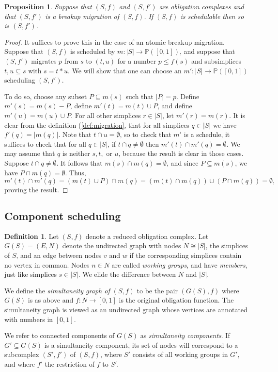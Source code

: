 \documentclass{amsart}
\def\PP{{\mathbb P}}
\def\to{\rightarrow}
\def\taking{\colon}
\def\ss{\subseteq}
\def\iso{\cong}
\newtheorem{proposition}[theorem]{Proposition}
\theoremstyle{remark}
\theoremstyle{definition}
\newtheorem{definition}[theorem]{Definition}
\begin{document}
\begin{proposition}

Suppose that $(S,f)$ and $(S,f')$ are obligation complexes and that $(S,f')$ is a breakup migration of $(S,f)$. If $(S,f)$ is schedulable then so is $(S,f')$.

\end{proposition}

\begin{proof}

It suffices to prove this in the case of an atomic breakup migration. Suppose that $(S,f)$ is scheduled by $m\taking |S|\to\PP([0,1])$, and suppose that $(S,f')$ migrates $p$ from $s$ to $(t,u)$ for a number $p\leq f(s)$ and subsimplices $t,u\ss s$ with $s=t\ast u$. We will show that one can choose an $m'\taking |S|\to\PP([0,1])$ scheduling $(S,f')$.

To do so, choose any subset $P\ss m(s)$ such that $|P|=p$. Define $m'(s)=m(s)-P$, define $m'(t)=m(t)\cup P$, and define $m'(u)=m(u)\cup P$. For all other simplices $r\in|S|$, let $m'(r)=m(r)$. It is clear from the definition (\ref{def:migration}, that for all simplices $q\in |S|$ we have $f'(q)=|m(q)|$. Note that $t\cap u=\emptyset$, so to check that $m'$ is a schedule, it suffices to check that for all $q\in|S|$, if $t\cap q\neq\emptyset$ then $m'(t)\cap m'(q)=\emptyset$. We may assume that $q$ is neither $s,t,$ or $u$, because the result is clear in those cases. Suppose $t\cap q\neq\emptyset$. It follows that $m(s)\cap m(q)=\emptyset$, and since $P\ss m(s)$, we have  $P\cap m(q)=\emptyset$. Thus, $$m'(t)\cap m'(q)=(m(t)\cup P)\cap m(q)=(m(t)\cap m(q))\cup(P\cap m(q))=\emptyset,$$ proving the result. 

\end{proof}

\subsection{Component scheduling}\label{sec:components}

\begin{definition}

Let $(S,f)$ denote a reduced obligation complex. Let $G(S)=(E,N)$ denote the undirected graph with nodes $N\iso |S|$, the simplices of $S$, and an edge between nodes $v$ and $w$ if the corresponding simplices contain no vertex in common. Nodes $n\in N$ are called {\em working groups}, and have {\em members}, just like simplices $s\in|S|$. We elide the difference between $N$ and $|S|$.

We define the {\em simultaneity graph of $(S,f)$} to be the pair $(G(S),f)$ where $G(S)$ is as above and $f\taking N\to[0,1]$ is the original obligation function. The simultaneity graph is viewed as an undirected graph whose vertices are annotated with numbers in $[0,1]$.

We refer to connected components of $G(S)$ as {\em simultaneity components}. If $G'\ss G(S)$ is a simultaneity component, its set of nodes will correspond to a subcomplex $(S',f')$ of $(S,f)$, where $S'$ consists of all working groups in $G'$, and where $f'$ the restriction of $f$ to $S'$.

\end{definition}
\end{document}
